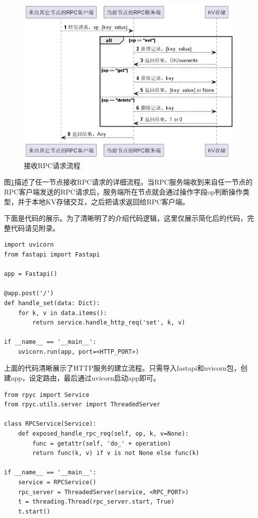 \begin{figure}[H]
    \centering
    \includegraphics[width=0.8\linewidth]{examples/接收RPC流程.png}
    \caption{接收RPC请求流程}
    \label{fig:recvrpc}
\end{figure}

图\ref{fig:recvrpc}描述了任一节点接收RPC请求的详细流程。当RPC服务端收到来自任一节点的RPC客户端发送的RPC请求后，服务端所在节点就会通过操作字段op判断操作类型，并于本地KV存储交互，之后把请求返回给RPC客户端。

下面是代码的展示。为了清晰明了的介绍代码逻辑，这里仅展示简化后的代码，完整代码请见附录。

\begin{lstlisting}
import uvicorn
from fastapi import Fastapi

app = Fastapi()

@app.post('/')
def handle_set(data: Dict):
    for k, v in data.items():
        return service.handle_http_req('set', k, v)

if __name__ == '__main__':
    uvicorn.run(app, port=<HTTP_PORT>)
\end{lstlisting}

上面的代码清晰展示了HTTP服务的建立流程。只需导入fastapi和uvicorn包，创建app，设定路由，最后通过uvicorn启动app即可。

\begin{lstlisting}
from rpyc import Service
from rpyc.utils.server import ThreadedServer

class RPCService(Service):
    def exposed_handle_rpc_req(self, op, k, v=None):
        func = getattr(self, 'do_' + operation)
        return func(k, v) if v is not None else func(k)

if __name__ == '__main__':
    service = RPCService() 
    rpc_server = ThreadedServer(service, <RPC_PORT>)
    t = threading.Thread(rpc_server.start, True)
    t.start()
\end{lstlisting}

